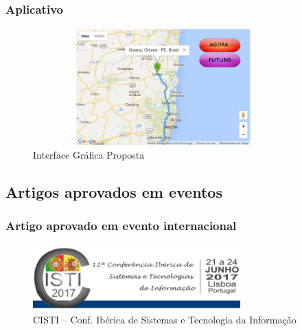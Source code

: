 \documentclass[11pt]{beamer}
\begin{document}
\begin{frame}\frametitle{ Aplicativo}
\transboxout[duration=2, direction=25]
	\begin{figure}[ht]
		\centering
		\includegraphics[width=100mm, height=45mm]{Figuras/Extras/InterfaceGrafica.png}
		\caption{ Interface Gráfica Proposta}		
	\end{figure}
\end{frame}

\subsection{Artigos aprovados em eventos} 
\begin{frame}\frametitle{ Artigo aprovado em evento internacional}
	\transboxout[duration=1, direction=25]
	\begin{figure}[ht]
		\centering
		\includegraphics[width=80mm, height=25mm]{Figuras/Extras/Cisti122.png}
		\caption{ CISTI -- Conf. Ibérica de Sistemas e Tecnologia da Informação}
	\end{figure}
\end{frame}
\end{document}
